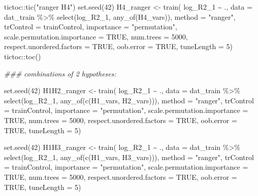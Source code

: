 \documentclass[
  letterpaper,
  DIV=11,
  numbers=noendperiod]{scrreprt}
\newenvironment{Shaded}{\begin{snugshade}}{\end{snugshade}}
\newcommand{\AttributeTok}[1]{\textcolor[rgb]{0.40,0.45,0.13}{#1}}
\newcommand{\ConstantTok}[1]{\textcolor[rgb]{0.56,0.35,0.01}{#1}}
\newcommand{\DecValTok}[1]{\textcolor[rgb]{0.68,0.00,0.00}{#1}}
\newcommand{\DocumentationTok}[1]{\textcolor[rgb]{0.37,0.37,0.37}{\textit{#1}}}
\newcommand{\FunctionTok}[1]{\textcolor[rgb]{0.28,0.35,0.67}{#1}}
\newcommand{\NormalTok}[1]{\textcolor[rgb]{0.00,0.23,0.31}{#1}}
\newcommand{\OtherTok}[1]{\textcolor[rgb]{0.00,0.23,0.31}{#1}}
\newcommand{\SpecialCharTok}[1]{\textcolor[rgb]{0.37,0.37,0.37}{#1}}
\newcommand{\StringTok}[1]{\textcolor[rgb]{0.13,0.47,0.30}{#1}}
\begin{document}
\begin{Shaded}
\begin{Highlighting}[]
\NormalTok{tictoc}\SpecialCharTok{::}\FunctionTok{tic}\NormalTok{(}\StringTok{"ranger H4"}\NormalTok{)}
\FunctionTok{set.seed}\NormalTok{(}\DecValTok{42}\NormalTok{)}
\NormalTok{H4\_ranger }\OtherTok{\textless{}{-}} \FunctionTok{train}\NormalTok{(}
\NormalTok{    log\_R2\_1 }\SpecialCharTok{\textasciitilde{}}\NormalTok{ .,}
    \AttributeTok{data =}\NormalTok{ dat\_train }\SpecialCharTok{\%\textgreater{}\%} \FunctionTok{select}\NormalTok{(log\_R2\_1, }\FunctionTok{any\_of}\NormalTok{(H4\_vars)),}
    \AttributeTok{method =} \StringTok{"ranger"}\NormalTok{,}
    \AttributeTok{trControl =}\NormalTok{ trainControl,}
    \AttributeTok{importance =} \StringTok{"permutation"}\NormalTok{,}
    \AttributeTok{scale.permutation.importance =} \ConstantTok{TRUE}\NormalTok{,}
    \AttributeTok{num.trees =} \DecValTok{5000}\NormalTok{,}
    \AttributeTok{respect.unordered.factors =} \ConstantTok{TRUE}\NormalTok{,}
    \AttributeTok{oob.error =} \ConstantTok{TRUE}\NormalTok{,}
    \AttributeTok{tuneLength =} \DecValTok{5}\NormalTok{)}
\NormalTok{tictoc}\SpecialCharTok{::}\FunctionTok{toc}\NormalTok{()}


\DocumentationTok{\#\#\# combinations of 2 hypotheses:}

\FunctionTok{set.seed}\NormalTok{(}\DecValTok{42}\NormalTok{)}
\NormalTok{H1H2\_ranger }\OtherTok{\textless{}{-}} \FunctionTok{train}\NormalTok{(}
\NormalTok{    log\_R2\_1 }\SpecialCharTok{\textasciitilde{}}\NormalTok{ .,}
    \AttributeTok{data =}\NormalTok{ dat\_train }\SpecialCharTok{\%\textgreater{}\%} \FunctionTok{select}\NormalTok{(log\_R2\_1, }\FunctionTok{any\_of}\NormalTok{(}\FunctionTok{c}\NormalTok{(H1\_vars, H2\_vars))),}
    \AttributeTok{method =} \StringTok{"ranger"}\NormalTok{,}
    \AttributeTok{trControl =}\NormalTok{ trainControl,}
    \AttributeTok{importance =} \StringTok{"permutation"}\NormalTok{,}
    \AttributeTok{scale.permutation.importance =} \ConstantTok{TRUE}\NormalTok{,}
    \AttributeTok{num.trees =} \DecValTok{5000}\NormalTok{,}
    \AttributeTok{respect.unordered.factors =} \ConstantTok{TRUE}\NormalTok{,}
    \AttributeTok{oob.error =} \ConstantTok{TRUE}\NormalTok{,}
    \AttributeTok{tuneLength =} \DecValTok{5}\NormalTok{)}

\FunctionTok{set.seed}\NormalTok{(}\DecValTok{42}\NormalTok{)}
\NormalTok{H1H3\_ranger }\OtherTok{\textless{}{-}} \FunctionTok{train}\NormalTok{(}
\NormalTok{    log\_R2\_1 }\SpecialCharTok{\textasciitilde{}}\NormalTok{ .,}
    \AttributeTok{data =}\NormalTok{ dat\_train }\SpecialCharTok{\%\textgreater{}\%} \FunctionTok{select}\NormalTok{(log\_R2\_1, }\FunctionTok{any\_of}\NormalTok{(}\FunctionTok{c}\NormalTok{(H1\_vars, H3\_vars))),}
    \AttributeTok{method =} \StringTok{"ranger"}\NormalTok{,}
    \AttributeTok{trControl =}\NormalTok{ trainControl,}
    \AttributeTok{importance =} \StringTok{"permutation"}\NormalTok{,}
    \AttributeTok{scale.permutation.importance =} \ConstantTok{TRUE}\NormalTok{,}
    \AttributeTok{num.trees =} \DecValTok{5000}\NormalTok{,}
    \AttributeTok{respect.unordered.factors =} \ConstantTok{TRUE}\NormalTok{,}
    \AttributeTok{oob.error =} \ConstantTok{TRUE}\NormalTok{,}
    \AttributeTok{tuneLength =} \DecValTok{5}\NormalTok{)}


\end{Highlighting}
\end{Shaded}
\end{document}
